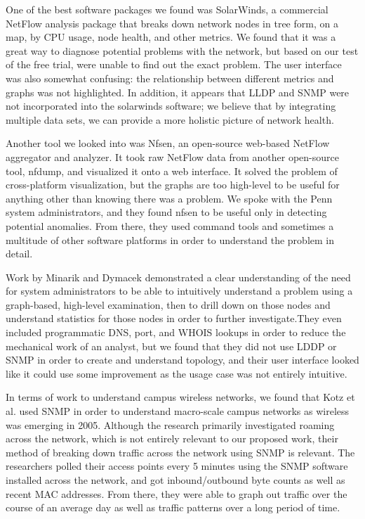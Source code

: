 \documentclass{sig-alternate}
\begin{document}
One of the best software packages we found was SolarWinds, a commercial NetFlow
analysis package that breaks down network nodes in tree form, on a map, by CPU
usage, node health, and other metrics.\cite{SolarWinds} We found that it was a
great way to diagnose potential problems with the network, but based on our test
of the free trial, were unable to find out the exact problem. The user interface
was also somewhat confusing: the relationship between different metrics and
graphs was not highlighted. In addition, it appears that LLDP and SNMP were not
incorporated into the solarwinds software; we believe that by integrating
multiple data sets, we can provide a more holistic picture of network health.

Another tool we looked into was Nfsen, an open-source web-based NetFlow
aggregator and analyzer.\cite{NfSen} It took raw NetFlow data from another
open-source tool, nfdump, and visualized it onto a web interface. It solved the
problem of cross-platform visualization, but the graphs are too high-level to be
useful for anything other than knowing there was a problem. We spoke with the
Penn system administrators, and they found nfsen to be useful only in detecting
potential anomalies. From there, they used command tools and sometimes a
multitude of other software platforms in order to understand the problem in
detail. 

Work by Minarik and Dymacek\cite{Minarik08} demonstrated a clear understanding
of the need for system administrators to be able to intuitively understand a
problem using a graph-based, high-level examination, then to drill down on those
nodes and understand statistics for those nodes in order to further
investigate.They even included programmatic DNS, port, and WHOIS lookups in
order to reduce the mechanical work of an analyst, but we found that they did
not use LDDP or SNMP in order to create and understand topology, and their user
interface looked like it could use some improvement as the usage case was not
entirely intuitive.

In terms of work to understand campus wireless networks, we found that Kotz et
al.\cite{Kotz05} used SNMP in order to understand macro-scale campus networks as
wireless was emerging in 2005. Although the research primarily investigated
roaming across the network, which is not entirely relevant to our proposed work,
their method of breaking down traffic across the network using SNMP is relevant.
The researchers polled their access points every 5 minutes using the SNMP
software installed across the network, and got inbound/outbound byte counts as
well as recent MAC addresses. From there, they were able to graph out traffic
over the course of an average day as well as traffic patterns over a long period
of time.
\end{document}
